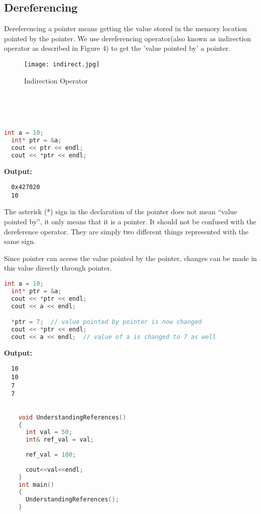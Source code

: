 \documentclass[11pt,fleqn]{book} %
\begin{document}
\subsection{Dereferencing}
Dereferencing a pointer means getting the value stored in the memory location pointed by the pointer.
We use dereferencing operator(also known as indirection operator as described in Figure 4) to get the 'value pointed by' a pointer.
\begin{figure}[h]
  \centering\texttt{[image: indirect.jpg]}
  \caption{Indirection Operator}
\end{figure} \\ \\ \\

\begin{lstlisting}[language=C++, caption = Dereferencing a pointer]
  int a = 10;
  int* ptr = &a; 
  cout << ptr << endl;
  cout << *ptr << endl; 
\end{lstlisting}
\textbf{Output:}
\begin{lstlisting}
  0x427020
  10
\end{lstlisting}

\begin{tcolorbox}[width=\textwidth,colback={white},title={KEYNOTE},colbacktitle=purple!50!white,coltitle=black] 
  The asterisk (*) sign in the declaration of the pointer does not mean “value pointed by”, it only means that it is a pointer. It should not be confused with the dereference operator. They are simply two different things represented with the same sign.
\end{tcolorbox}
\hfill \break
Since pointer can access the value pointed by the pointer, changes can be made in this value directly through pointer.
\begin{lstlisting}[language=C++, caption = Modifying value of the address pointed by the pointer]
  int a = 10;
  int* ptr = &a; 
  cout << *ptr << endl;
  cout << a << endl;

  *ptr = 7;  // value pointed by pointer is now changed
  cout << *ptr << endl;
  cout << a << endl;  // value of a is changed to 7 as well
\end{lstlisting}
\textbf{Output:} 
\begin{lstlisting}
  10
  10
  7
  7
\end{lstlisting}

\begin{example}
  \begin{lstlisting}[language=C++, caption = Understanding Reference]

    void UnderstandingReferences()
    {
      int val = 50;
      int& ref_val = val;
      
      ref_val = 100;
      
      cout<<val<<endl;
    }
    int main()
    {
      UnderstandingReferences();	
    }
  \end{lstlisting}
\end{example}
\end{document}
